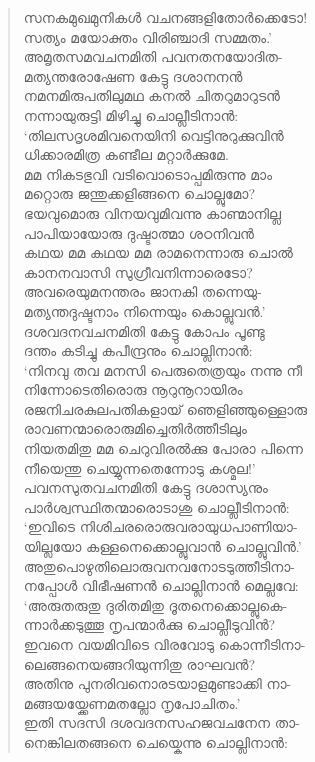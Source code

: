 \begin{verse}
സനകമുഖമുനികള്‍ വചനങ്ങളിതോര്‍ക്കെടോ!\\
സത്യം മയോക്തം വിരിഞ്ചാദി സമ്മതം.’\\
അമൃതസമവചനമിതി പവനതനയോദിത-\\
മത്യന്തരോഷേണ കേട്ടു ദശാനനന്‍\\
നമനമിരുപതിലുമഥ കനല്‍ ചിതറുമാറുടന്‍\\
നന്നായുരുട്ടി മിഴിച്ചു ചൊല്ലീടിനാന്‍:\\
‘തിലസദൃശമിവനെയിനി വെട്ടിനുറുക്കുവിന്‍\\
ധിക്കാരമിത്ര കണ്ടീല മറ്റാര്‍ക്കുമേ.\\
മമ നികടഭുവി വടിവൊടൊപ്പമിരുന്നു മാം\\
മറ്റൊരു ജന്തുക്കളിങ്ങനെ ചൊല്ലുമോ?\\
ഭയവുമൊരു വിനയവുമിവന്നു കാണ്മാനില്ല\\
പാപിയായോരു ദുഷ്ടാത്മാ ശഠനിവന്‍\\
കഥയ മമ കഥയ മമ രാമനെന്നാരു ചൊല്‍\\
കാനനവാസി സുഗ്രീവനിന്നാരെടോ?\\
അവരെയുമനന്തരം ജാനകി തന്നെയു-\\
മത്യന്തദുഷ്ടനാം നിന്നെയും കൊല്ലുവന്‍.’\\
ദശവദനവചനമിതി കേട്ടു കോപം പൂണ്ടു\\
ദന്തം കടിച്ചു കപീന്ദ്രനും ചൊല്ലിനാന്‍:\\
‘നിനവു തവ മനസി പെരുതെത്രയും നന്നു നീ\\
നിന്നോടെതിരൊരു നൂറുനൂറായിരം\\
രജനിചരകുലപതികളായ് ഞെളിഞ്ഞുള്ളൊരു\\
രാവണന്മാരൊരുമിച്ചെതിര്‍ത്തീടിലും\\
നിയതമിതു മമ ചെറുവിരല്‍ക്കു പോരാ പിന്നെ\\
നീയെന്തു ചെയ്യുന്നതെന്നോടു കശ്മല!’\\
പവനസുതവചനമിതി കേട്ടു ദശാസ്യനും\\
പാര്‍ശ്വസ്ഥിതന്മാരൊടാശു ചൊല്ലീടിനാന്‍:\\
‘ഇവിടെ നിശിചരരൊരുവരായുധപാണിയാ-\\
യില്ലയോ കള്ളനെക്കൊല്ലുവാന്‍ ചൊല്ലുവിന്‍.’\\
അതുപൊഴുതിലൊരുവനവനോടടുത്തീടിനാ-\\
നപ്പോള്‍ വിഭീഷണന്‍ ചൊല്ലിനാന്‍ മെല്ലവേ:\\
‘അരുതരുതു ദുരിതമിതു ദൂതനെക്കൊല്ലുകെ-\\
ന്നാര്‍ക്കടുത്തൂ നൃപന്മാര്‍ക്കു ചൊല്ലീടുവിന്‍?\\
ഇവനെ വയമിവിടെ വിരവോടു കൊന്നീടിനാ-\\
ലെങ്ങനെയങ്ങറിയുന്നിതു രാഘവന്‍?\\
അതിനു പുനരിവനൊരടയാളമുണ്ടാക്കി നാ-\\
മങ്ങയയ്ക്കേണമതല്ലോ നൃപോചിതം.’\\
ഇതി സദസി ദശവദനസഹജവചനേന താ-\\
നെങ്കിലതങ്ങനെ ചെയ്കെന്നു ചൊല്ലിനാന്‍:
\end{verse}

